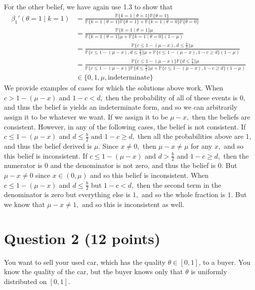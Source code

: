 \documentclass[11pt]{article}
\newcommand{\bbP}{\mathbb{P}}
\begin{document}
\begin{solution}
    For the other belief, we have again use 1.3 to show that
    \begin{align*}
    \beta_1'(\theta = 1 \mid k= 1)& = \frac{\bbP\{k = 1\mid \theta = 1\}\bbP\{\theta=1\}}{\bbP\{k = 1\mid \theta = 1\}\bbP\{\theta=1\} + \bbP\{k = 1\mid \theta = 0\}\bbP\{\theta=0\}}\\
    &= \frac{\bbP\{k = 1\mid \theta = 1\}\mu}{\bbP\{k = 1\mid \theta = 1\}\mu + \bbP\{k = 1\mid \theta = 0\}(1-\mu)}\\
    &=\frac{\bbP\{c\leq 1- (\mu - x), d\leq \frac{b}{2}\}\mu}{\bbP\{c\leq 1- (\mu - x), d\leq \frac{b}{2}\}\mu + \bbP\{c \leq 1 - (\mu - x), 1 - c\geq d\}(1-\mu)}\\
    &= \frac{\bbP\{c\leq 1- (\mu - x)\} \bbP\{d\leq \frac{b}{2}\}\mu}{\bbP\{c\leq 1- (\mu - x)\}\bbP\{d\leq \frac{b}{2}\}\mu + \bbP\{c \leq 1 - (\mu - x), 1 - c\geq d\}(1-\mu)}\\
    & \in \{0, 1,\mu, \text{indeterminate}\}
    \end{align*}
We provide examples of cases for which the solutions above work.
When $c> 1- (\mu -x)$ and $1-c <d,$ then the probability of all of these events is $0,$ and thus the belief is yields an indeterminate form, and so we can arbitrarily assign it to be whatever we want. If we assign it to be $\mu -x,$ then the beliefs are consistent. However, in any of the following cases, the belief is not consistent. If $c\leq 1 - (\mu -x)$ and $d\leq \frac{b}{2}$ and $1-c \geq d,$ then all the probabilities above are $1,$ and thus the belief derived is $\mu.$ Since $x\neq 0,$ then $\mu - x\neq \mu$ for any $x,$ and so this belief is inconsistent. If $c\leq 1- (\mu - x)$ and $d> \frac{b}{2}$ and $1-c \geq d,$ then the numerator is $0$ and the denominator is not zero, and thus the belief is $0.$ But $\mu - x \neq 0$ since $x\in (0,\mu)$ and so this belief is inconsistent. When $c\leq 1- (\mu - x)$ and $d\leq \frac{b}{2}$ but $1-c <d,$ then the second term in the denominator is zero but everything else is $1,$ and so the whole fraction is $1.$ But we know that $\mu  -x \neq 1,$ and so this is inconsistent as well.   
\end{solution}

\newpage

\section*{Question 2 (12 points)}

You want to sell your used car, which has the quality $\theta \in [0,1]$, to a buyer. You know the quality of the car, but the buyer knows only that $\theta$ is uniformly distributed on $[0,1]$. 
\end{document}
